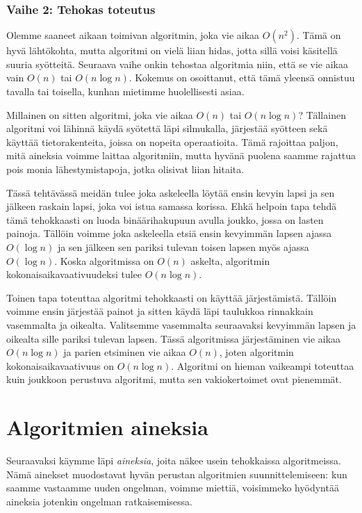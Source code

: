 \subsubsection{Vaihe 2: Tehokas toteutus}

Olemme saaneet aikaan toimivan algoritmin, joka vie aikaa $O(n^2)$.
Tämä on hyvä lähtökohta, mutta algoritmi on vielä liian hidas,
jotta sillä voisi käsitellä suuria syötteitä.
Seuraava vaihe onkin tehostaa algoritmia niin,
että se vie aikaa vain $O(n)$ tai $O(n \log n)$.
Kokemus on osoittanut, että tämä yleensä onnistuu tavalla
tai toisella, kunhan mietimme huolellisesti asiaa.

Millainen on sitten algoritmi, joka vie aikaa $O(n)$ tai $O(n \log n)$?
Tällainen algoritmi voi lähinnä käydä syötettä läpi silmukalla,
järjestää syötteen sekä käyttää tietorakenteita,
joissa on nopeita operaatioita.
Tämä rajoittaa paljon, mitä aineksia voimme laittaa algoritmiin,
mutta hyvänä puolena saamme rajattua pois monia lähestymistapoja,
jotka olisivat liian hitaita.

Tässä tehtävässä meidän tulee joka askeleella löytää
ensin kevyin lapsi ja sen jälkeen raskain lapsi,
joka voi istua samassa korissa.
Ehkä helpoin tapa tehdä tämä tehokkaasti
on luoda binäärihakupuun avulla joukko, jossa on lasten painoja.
Tällöin voimme joka askeleella etsiä ensin kevyimmän
lapsen ajassa $O(\log n)$ ja sen jälkeen sen pariksi
tulevan toisen lapsen myös ajassa $O(\log n)$.
Koska algoritmissa on $O(n)$ askelta, algoritmin
kokonaisaikavaativuudeksi tulee $O(n \log n)$.

Toinen tapa toteuttaa algoritmi tehokkaasti on käyttää
järjestämistä.
Tällöin voimme ensin järjestää painot ja sitten käydä
läpi taulukkoa rinnakkain vasemmalta ja oikealta.
Valitsemme vasemmalta seuraavaksi kevyimmän lapsen
ja oikealta sille pariksi tulevan lapsen.
Tässä algoritmissa järjestäminen vie aikaa $O(n \log n)$
ja parien etsiminen vie aikaa $O(n)$,
joten algoritmin kokonaisaikavaativuus on $O(n \log n)$.
Algoritmi on hieman vaikeampi toteuttaa kuin joukkoon
perustuva algoritmi, mutta sen vakiokertoimet ovat pienemmät.

\section{Algoritmien aineksia}

Seuraavaksi käymme läpi \emph{aineksia},
joita näkee usein tehokkaissa algoritmeissa.
Nämä ainekset muodostavat hyvän perustan algoritmien
suunnittelemiseen: kun saamme vastaamme uuden ongelman,
voimme miettiä, voisimmeko hyödyntää aineksia jotenkin
ongelman ratkaisemisessa.

